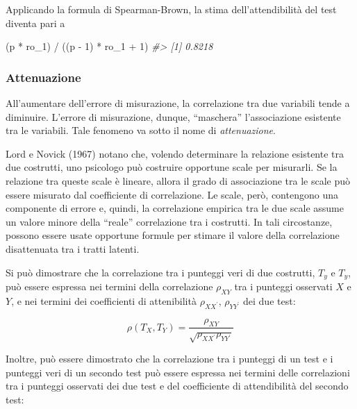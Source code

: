 \documentclass[
  11pt,
]{krantz}
\makeatletter
\newenvironment{Shaded}{\begin{snugshade}}{\end{snugshade}}
\newcommand{\CommentTok}[1]{\textcolor[rgb]{0.37,0.37,0.37}{\textit{#1}}}
\newcommand{\DecValTok}[1]{\textcolor[rgb]{0.06,0.06,0.06}{#1}}
\newcommand{\NormalTok}[1]{#1}
\newcommand{\SpecialCharTok}[1]{\textcolor[rgb]{0,0,0}{#1}}
\newenvironment{kframe}{%
\medskip{}
\setlength{\fboxsep}{.8em}
 \def\at@end@of@kframe{}%
 \ifinner\ifhmode%
  \def\at@end@of@kframe{\end{minipage}}%
  \begin{minipage}{\columnwidth}%
 \fi\fi%
 \def\FrameCommand##1{\hskip\@totalleftmargin \hskip-\fboxsep
 \colorbox{shadecolor}{##1}\hskip-\fboxsep
     \hskip-\linewidth \hskip-\@totalleftmargin \hskip\columnwidth}%
 \MakeFramed {\advance\hsize-\width
   \@totalleftmargin\z@ \linewidth\hsize
   \@setminipage}}%
 {\par\unskip\endMakeFramed%
 \at@end@of@kframe}
\renewenvironment{Shaded}{\begin{kframe}}{\end{kframe}}
\theoremstyle{definition}
\theoremstyle{definition}
\theoremstyle{definition}
\theoremstyle{definition}
\theoremstyle{remark}
\makeatother
\begin{document}
Applicando la formula di Spearman-Brown, la stima dell'attendibilità del test diventa pari a

\begin{Shaded}
\begin{Highlighting}[]
\NormalTok{(p }\SpecialCharTok{*}\NormalTok{ ro\_1) }\SpecialCharTok{/}\NormalTok{ ((p }\SpecialCharTok{{-}} \DecValTok{1}\NormalTok{) }\SpecialCharTok{*}\NormalTok{ ro\_1 }\SpecialCharTok{+} \DecValTok{1}\NormalTok{)}
\CommentTok{\#\textgreater{} [1] 0.8218}
\end{Highlighting}
\end{Shaded}

\hypertarget{attenuazione}{%
\subsubsection{Attenuazione}\label{attenuazione}}

All'aumentare dell'errore di misurazione, la correlazione tra due variabili tende a diminuire. L'errore di misurazione, dunque, ``maschera'' l'associazione esistente tra le variabili. Tale fenomeno va sotto il nome di \emph{attenuazione}.

Lord e Novick (1967) notano che, volendo determinare la relazione esistente tra due costrutti, uno psicologo può costruire opportune scale per misurarli. Se la relazione tra queste scale è lineare, allora il grado di associazione tra le scale può essere misurato dal coefficiente di correlazione. Le scale, però, contengono una componente di errore e, quindi, la correlazione empirica tra le due scale assume un valore minore della ``reale'' correlazione tra i costrutti. In tali circostanze, possono essere usate opportune formule per stimare il valore della correlazione disattenuata tra i tratti latenti.

Si può dimostrare che la correlazione tra i punteggi veri di due costrutti, \(T_y\) e \(T_y\), può essere espressa nei termini della correlazione \(\rho_{XY}\) tra i punteggi osservati \(X\) e \(Y\), e nei termini dei coefficienti di attenibilità \(\rho_{XX^\prime}\), \(\rho_{YY^\prime}\) dei due test:

\begin{equation}
\rho(T_X, T_Y)  = \frac{\rho_{XY}}{\sqrt{\rho_{XX^\prime} \rho_{YY^\prime}}}
\label{eq:3-9-6}
\end{equation}

Inoltre, può essere dimostrato che la correlazione tra i punteggi di un test e i punteggi veri di un secondo test può essere espressa nei termini delle correlazioni tra i punteggi osservati dei due test e del coefficiente di attendibilità del secondo test:
\end{document}
